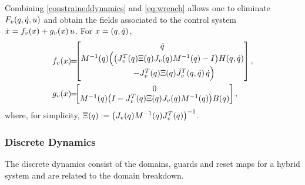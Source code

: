 %
Combining \eqref{constraineddynamics} and \eqref{eq:wrench} allows one to eliminate $F_{v}(q, \dot{q}, u)$ and obtain the fields associated to the control system ${\dot {x}} = f_{v}(x) + g_{v}(x) \, u$. For $x = (q, \dot{q})$,
%
\begin{align}
  f_{v}\arx \!\! &= \!\!\! \left[\!\!\!\begin{array}{c}
    \dq\\
    \M^{-1}\argsq\Big( \big(J_{v}^{T}\argsq \Xi\argsq J_{v}\argsq \M^{-1}\argsq - I \big) \HCor\argsqdq \\
    \hspace{1cm}- J_{v}^{T}\argsq \Xi\argsq {\dot J}_{v}^{T}\argsqdq \, \dq \Big)
    \end{array}\!\!\!\right],\\
  \label{eqn:controlsystem}
  g_{v}\arx \!\! &= \!\!\! \left[\!\!\!\begin{array}{c}
    0\\
    \M^{-1}\argsq \big(I - J_{v}^{T}\argsq \Xi\argsq J_{v}\argsq \M^{-1}\argsq \big) \B\argsq
    \end{array}\!\!\!\right],
\end{align}
%
where, for simplicity, $\Xi(q) := \big( J_{v}(q) M^{-1}(q) J_{v}^{T}(q) \big)^{-1}$.


\subsubsection{Discrete Dynamics}

The discrete dynamics consist of the domains, guards and reset maps for a hybrid system and are related to the domain breakdown.

